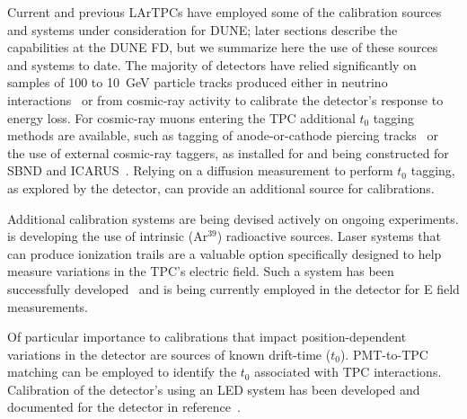 Current and previous LArTPCs have employed some of the calibration sources and systems under consideration for DUNE; later sections describe the capabilities at the DUNE FD, but we summarize here the use of these sources and systems to date.
The majority of  detectors have relied significantly on samples of \num{100} to \SI{10}{\GeV} particle tracks produced either in neutrino interactions~\cite{Anderson:2012mra} or from cosmic-ray activity to calibrate the detector's response to energy loss. 
For cosmic-ray muons entering the TPC additional $t_0$ tagging methods are available, such as tagging of anode-or-cathode piercing tracks~\cite{bib:uB_ACPT} or the use of external cosmic-ray taggers, as installed for  and being constructed for SBND and ICARUS~\cite{Auger:2016tjc}. Relying on a diffusion measurement to perform $t_0$ tagging, as explored by the  detector, can provide an additional source for calibrations.

Additional calibration systems are being devised actively on ongoing  experiments.  is developing the use of intrinsic (Ar${}^{39}$) radioactive sources. 
Laser systems that can produce ionization trails are a valuable option specifically designed to help measure variations in the TPC's electric field. Such a system has been successfully developed~\cite{Ereditato:2014tya} and is being currently employed in the  detector for E field measurements.


Of particular importance to calibrations that impact position-dependent variations in the detector are sources of known drift-time ($t_0$). PMT-to-TPC matching can be employed to identify the $t_0$ associated with TPC interactions. 
Calibration of the detector's  using an LED system has been developed and documented for the  detector in reference~\cite{Conrad:2015xta}.

